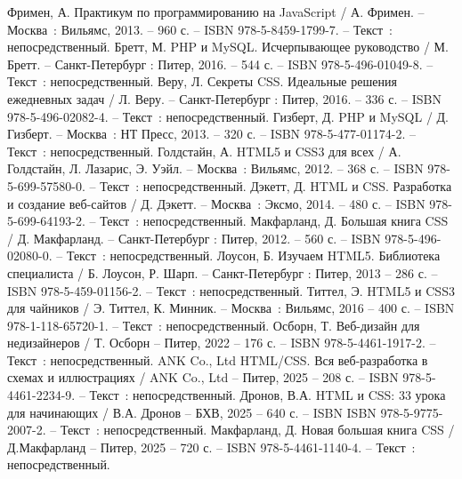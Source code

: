 
\begin{thebibliography}{9}
	
	 Фримен, А. Практикум по программированию на JavaScript / А. Фримен. – Москва~: Вильямс, 2013. – 960 с. – ISBN 978-5-8459-1799-7. – Текст~: непосредственный.
	 Бретт, М. PHP и MySQL. Исчерпывающее руководство / М. Бретт. – Санкт-Петербург : Питер, 2016. – 544 с. – ISBN 978-5-496-01049-8. – Текст~: непосредственный.
	 Веру, Л. Секреты CSS. Идеальные решения ежедневных задач / Л. Веру. – Санкт-Петербург : Питер, 2016. – 336 с. – ISBN 978-5-496-02082-4. – Текст~: непосредственный.
		Гизберт, Д. PHP и MySQL / Д. Гизберт. – Москва~: НТ Пресс, 2013. – 320 с. – ISBN 978-5-477-01174-2. – Текст~: непосредственный.
		Голдстайн, А. HTML5 и CSS3 для всех / А. Голдстайн, Л. Лазарис, Э. Уэйл. – Москва~: Вильямс, 2012. – 368 с. – ISBN 978-5-699-57580-0. – Текст~: непосредственный.
		Дэкетт, Д. HTML и CSS. Разработка и создание веб-сайтов / Д. Дэкетт. – Москва~: Эксмо, 2014. – 480 с. – ISBN 978-5-699-64193-2. – Текст~: непосредственный.
		Макфарланд, Д. Большая книга CSS / Д. Макфарланд. – Санкт-Петербург : Питер, 2012. – 560 с. – ISBN 978-5-496-02080-0. – Текст~: непосредственный.
		Лоусон, Б. Изучаем HTML5. Библиотека специалиста / Б. Лоусон, Р. Шарп. – Санкт-Петербург : Питер, 2013 – 286 с. – ISBN 978-5-459-01156-2. – Текст~: непосредственный.
		Титтел, Э. HTML5 и CSS3 для чайников / Э. Титтел, К. Минник. – Москва~: Вильямс, 2016 – 400 с. – ISBN 978-1-118-65720-1. – Текст~: непосредственный.    
		Осборн, Т. Веб-дизайн для недизайнеров / Т. Осборн – Питер, 2022 – 176 с. – ISBN 978-5-4461-1917-2. – Текст~: непосредственный.    
		ANK Co., Ltd  HTML/CSS. Вся веб-разработка в схемах и иллюстрациях  / ANK Co., Ltd –   Питер, 2025 – 208 с. – ISBN 
	978-5-4461-2234-9. – Текст~: непосредственный.    
		Дронов, В.А. HTML и CSS: 33 урока для начинающих / В.А. Дронов – БХВ, 2025 – 640 с. – ISBN ISBN
	978-5-9775-2007-2. – Текст~: непосредственный.    
		Макфарланд, Д. Новая большая книга CSS  / Д.Макфарланд  – Питер, 2025 – 720 с. – ISBN 
	978-5-4461-1140-4. – Текст~: непосредственный.
\end{thebibliography}
